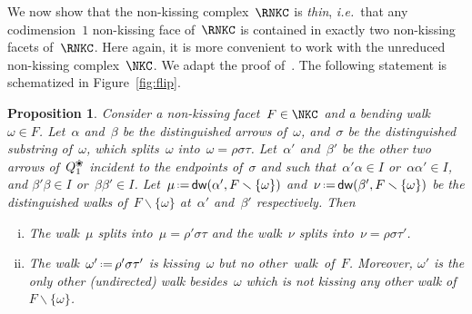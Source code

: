 \documentclass{amsart}
\newtheorem{proposition}[theorem]{Proposition}
\theoremstyle{definition}
\newcommand{\ssm}{\smallsetminus} %
\newcommand{\eqdef}{\mbox{\,\raisebox{0.2ex}{\scriptsize\ensuremath{\mathrm:}}\ensuremath{=}\,}} %
\newcommand{\fref}[1]{Figure~\ref{#1}} %
\newcommand{\ie}{\textit{i.e.}~} %
\newcommand{\darkblue}{\color{darkblue}} %
\newcommand{\defn}[1]{\textsl{\darkblue #1}} %
\newcommand{\blossom}{^\text{\ding{96}}} %
\newcommand{\distinguishedWalk}[2]{\mathsf{dw}(#1,#2)} %
\begin{document}
We now show that the non-kissing complex~$\RNKC$ is \defn{thin}, \ie that any codimension~$1$ non-kissing face of~$\RNKC$ is contained in exactly two non-kissing facets of~$\RNKC$.
Here again, it is more convenient to work with the unreduced non-kissing complex~$\NKC$.
We adapt the proof of~\cite[Thm~3.2\,(3)]{McConville}.
The following statement is schematized in \fref{fig:flip}.

\pagebreak

\begin{proposition}
\label{prop:flip}
Consider a non-kissing facet~$F \in \NKC$ and a bending walk~$\omega \in F$.
Let~$\alpha$ and~$\beta$ be the distinguished arrows of~$\omega$, and~$\sigma$ be the distinguished substring of~$\omega$, which splits~$\omega$ into~$\omega = \rho \sigma \tau$.
Let~$\alpha'$ and~$\beta'$ be the other two arrows of~$Q_1\blossom$ incident to the endpoints of~$\sigma$ and such that~$\alpha'\alpha \in I$ or~$\alpha\alpha' \in I$, and $\beta'\beta \in I$ or~$\beta\beta' \in I$.
Let~$\mu \eqdef \distinguishedWalk{\alpha'}{F \ssm \{\omega\}}$ and~$\nu \eqdef \distinguishedWalk{\beta'}{F \ssm \{\omega\}}$ be the distinguished walks of~$F \ssm \{\omega\}$ at~$\alpha'$ and~$\beta'$ respectively.
Then
\begin{enumerate}[(i)]
\item The walk~$\mu$ splits into~$\mu = \rho' \sigma \tau$ and the walk~$\nu$ splits into~$\nu = \rho \sigma \tau'$.
\item The walk~$\omega' \eqdef \rho' \sigma \tau'$ is kissing~$\omega$ but no other~walk~of~$F$. Moreover, $\omega'$ is the only other (undirected) walk besides~$\omega$ which is not kissing any other walk of~$F \ssm \{\omega\}$.
\end{enumerate}
\end{proposition}
\end{document}
